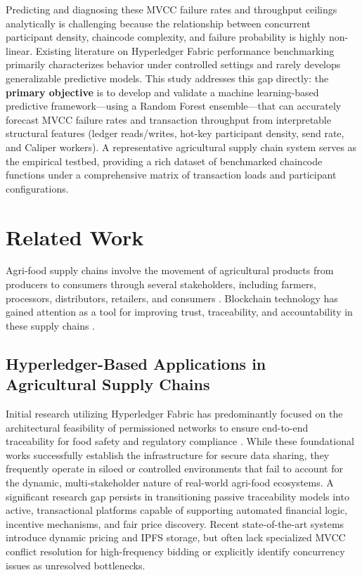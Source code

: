 \documentclass[12pt]{article}
\begin{document}
Predicting and diagnosing these MVCC failure rates and throughput ceilings analytically is challenging because the relationship between concurrent participant density, chaincode complexity, and failure probability is highly non-linear. Existing literature on Hyperledger Fabric performance benchmarking primarily characterizes behavior under controlled settings and rarely develops generalizable predictive models. This study addresses this gap directly: the \textbf{primary objective} is to develop and validate a machine learning-based predictive framework---using a Random Forest ensemble---that can accurately forecast MVCC failure rates and transaction throughput from interpretable structural features (ledger reads/writes, hot-key participant density, send rate, and Caliper workers). A representative agricultural supply chain system serves as the empirical testbed, providing a rich dataset of benchmarked chaincode functions under a comprehensive matrix of transaction loads and participant configurations.
	
\section{Related Work}

Agri-food supply chains involve the movement of agricultural products from producers to consumers through several stakeholders, including farmers, processors, distributors, retailers, and consumers \citep{weerabahu_challenges_2022,nayal_antecedents_2021}. Blockchain technology has gained attention as a tool for improving trust, traceability, and accountability in these supply chains \citep{zhao_blockchain_2019,shahid_blockchain-based_2020}.

	\subsection{Hyperledger-Based Applications in Agricultural Supply Chains}
	
	Initial research utilizing Hyperledger Fabric has predominantly focused on the architectural feasibility of permissioned networks to ensure end-to-end traceability for food safety and regulatory compliance \cite{marchese_blockchain-based_2022, zhang_information_2022, iftekhar_blockchain-based_2021, joo_evidence_2021}. While these foundational works successfully establish the infrastructure for secure data sharing, they frequently operate in siloed or controlled environments that fail to account for the dynamic, multi-stakeholder nature of real-world agri-food ecosystems. A significant research gap persists in transitioning passive traceability models into active, transactional platforms capable of supporting automated financial logic, incentive mechanisms, and fair price discovery. Recent state-of-the-art systems \cite{rani_stp_2025, talib_blockchain-enabled_2026, zhang_blockchain-based_2023} introduce dynamic pricing and IPFS storage, but often lack specialized MVCC conflict resolution for high-frequency bidding or explicitly identify concurrency issues as unresolved bottlenecks.
	
\end{document}
